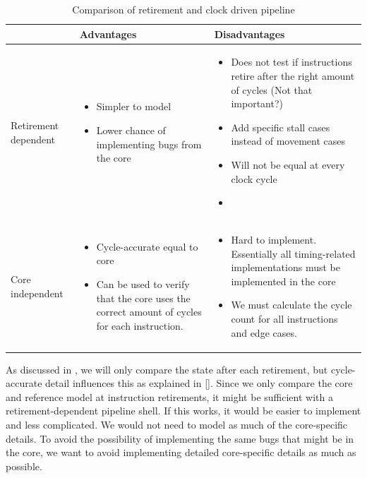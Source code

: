 \begin{table}[htb]
\centering
\caption{Comparison of retirement and clock driven pipeline}
\label{tab:retirementvsclock}
\begin{tabularx}{\textwidth}{|p{15mm}|*{2}{>{\arraybackslash} X |}}
\hline
 & Advantages & Disadvantages \\
\hline
Retirement dependent
& \begin{itemize}
\item Simpler to model
\item Lower chance of implementing bugs from the core
\end{itemize}
& \begin{itemize}
\item Does not test if instructions retire after the right amount of cycles (Not that important?)
\item Add specific stall cases instead of movement cases
\item Will not be equal at every clock cycle
\item 
\end{itemize} \\
\hline
Core independent
& \begin{itemize}
\item Cycle-accurate equal to core
\item Can be used to verify that the core uses the correct amount of cycles for each instruction. 
\end{itemize}
& \begin{itemize}
\item Hard to implement. Essentially all timing-related implementations must be implemented in the core
\item We must calculate the cycle count for all instructions and edge cases.
\end{itemize} \\
\hline
\end{tabularx}
\end{table}

As discussed in , we will only compare the state after each retirement, but cycle-accurate detail influences this as explained in \ref{}.
Since we only compare the core and reference model at instruction retirements, it might be sufficient with a retirement-dependent pipeline shell. If this works, it would be easier to implement and less complicated. We would not need to model as much of the core-specific details. To avoid the possibility of implementing the same bugs that might be in the core, we want to avoid implementing detailed core-specific details as much as possible.

